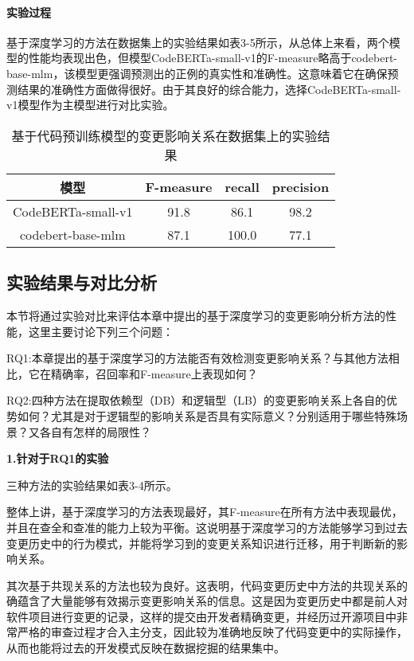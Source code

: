 \paragraph{实验过程}

    
    基于深度学习的方法在数据集上的实验结果如表3-5所示，从总体上来看，两个模型的性能均表现出色，但模型CodeBERTa-small-v1的F-measure略高于codebert-base-mlm，该模型更强调预测出的正例的真实性和准确性。这意味着它在确保预测结果的准确性方面做得很好。由于其良好的综合能力，选择CodeBERTa-small-v1模型作为主模型进行对比实验。
    
    \begin{table}[htbp]
    \caption{基于代码预训练模型的变更影响关系在数据集上的实验结果}
    \vspace{0.5em}\centering\wuhao
    \begin{tabular}{cccc}
    \toprule
    模型& F-measure & recall & precision \\
    \midrule
    CodeBERTa-small-v1 & 91.8 & 86.1 & 98.2 \\
    codebert-base-mlm  & 87.1 & 100.0  & 77.1 \\
    \bottomrule
    \end{tabular}
    \end{table}

\subsection{实验结果与对比分析}

本节将通过实验对比来评估本章中提出的基于深度学习的变更影响分析方法的性能，这里主要讨论下列三个问题：

RQ1:本章提出的基于深度学习的方法能否有效检测变更影响关系？与其他方法相比，它在精确率，召回率和F-measure上表现如何？

RQ2:四种方法在提取依赖型（DB）和逻辑型（LB）的变更影响关系上各自的优势如何？尤其是对于逻辑型的影响关系是否具有实际意义？分别适用于哪些特殊场景？又各自有怎样的局限性？


\textbf{1.针对于RQ1的实验}

三种方法的实验结果如表3-4所示。


整体上讲，基于深度学习的方法表现最好，其F-measure在所有方法中表现最优，并且在查全和查准的能力上较为平衡。这说明基于深度学习的方法能够学习到过去变更历史中的行为模式，并能将学习到的变更关系知识进行迁移，用于判断新的影响关系。

其次基于共现关系的方法也较为良好。这表明，代码变更历史中方法的共现关系的确蕴含了大量能够有效揭示变更影响关系的信息。这是因为变更历史中都是前人对软件项目进行变更的记录，这样的提交由开发者精确变更，并经历过开源项目中非常严格的审查过程才合入主分支，因此较为准确地反映了代码变更中的实际操作，从而也能将过去的开发模式反映在数据挖掘的结果集中。

